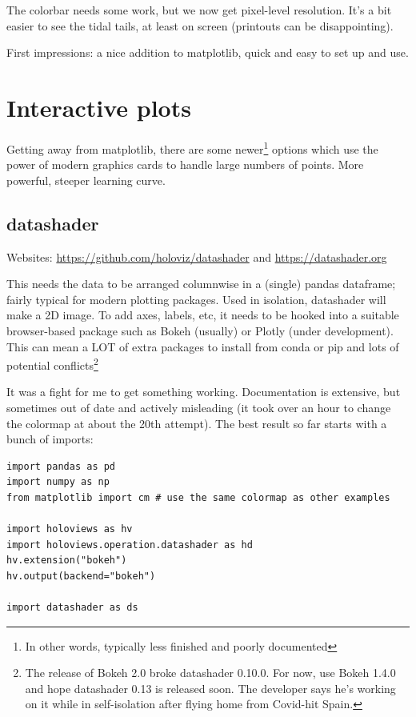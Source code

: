 The colorbar needs some work, but we now get pixel-level resolution. It's a bit easier to see the tidal tails, at least on screen (printouts can be disappointing).

First impressions: a nice addition to matplotlib, quick and easy to set up and use.

\section{Interactive plots}

Getting away from matplotlib, there are some newer\footnote{In other words, typically less finished and poorly documented} options which use the power of modern graphics cards to handle large numbers of points. More powerful, steeper learning curve.

\subsection{datashader}

Websites: \url{https://github.com/holoviz/datashader} and \url{https://datashader.org}

This needs the data to be arranged columnwise in a (single) pandas dataframe; fairly typical for modern plotting packages. Used in isolation, datashader will make a 2D image. To add axes, labels, etc, it needs to be hooked into a suitable browser-based package such as Bokeh (usually) or Plotly (under development). This can mean a LOT of extra packages to install from conda or pip and lots of potential conflicts\footnote{The release of Bokeh 2.0 broke datashader 0.10.0. For now, use Bokeh 1.4.0 and hope datashader 0.13 is released soon. The developer says he's working on it while in self-isolation after flying home from Covid-hit Spain.}

It was a fight for me to get something working. Documentation is extensive, but sometimes out of date and actively misleading (it took over an hour to change the colormap at about the 20th attempt).
The best result so far starts with a bunch of imports:

\begin{lstlisting}
import pandas as pd
import numpy as np
from matplotlib import cm # use the same colormap as other examples

import holoviews as hv
import holoviews.operation.datashader as hd
hv.extension("bokeh") 
hv.output(backend="bokeh")

import datashader as ds
\end{lstlisting}

